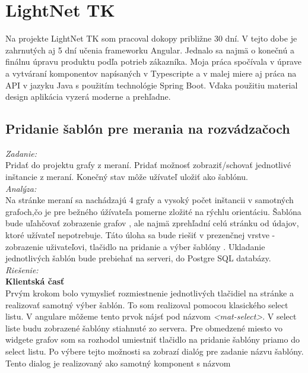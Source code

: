\documentclass[11pt, oneside]{report}
\begin{document}
\section{LightNet TK}
Na projekte LightNet TK som pracoval dokopy približne  30 dní. V tejto dobe  je zahrnutých aj 5 dní učenia frameworku Angular. Jednalo sa najmä o konečnú a finálnu úpravu produktu podľa potrieb zákazníka. Moja práca spočívala v úprave a vytváraní  komponentov napísaných v Typescripte a v malej miere aj práca na API  v jazyku Java s použitím technológie Spring Boot. Vďaka použitiu material design aplikácia vyzerá moderne a prehľadne.
\subsection{Pridanie šablón pre merania na rozvádzačoch }
\textit{Zadanie:}\\
Pridať do projektu grafy  z meraní. Pridať možnosť zobraziť/schovať jednotlivé inštancie  z meraní. Konečný stav môže užívateľ uložiť ako šablónu.
\\\textit{Analýza:}\\
Na stránke meraní sa nachádzajú 4 grafy  a vysoký počet inštancii v samotných grafoch,čo  je pre bežného úžívateľa pomerne zložité na rýchlu orientáciu. 
Šablóna bude uľahčovať zobrazenie grafov , ale najmä zprehľadní celú stránku od  údajov, ktoré užívateľ nepotrebuje. Táto úloha sa bude riešiť v prezenčnej vrstve - zobrazenie uživateľovi, tlačidlo na pridanie a výber šablóny . Ukladanie jednotlivých šablón bude prebiehať  na serveri, do Postgre SQL databázy.
\\\textit{Riešenie:}\\
\textbf{Klientská časť}\\
Prvým krokom bolo vymyslieť rozmiestnenie jednotlivých  tlačidiel na stránke a realizovať samotný výber šablón. To som realizoval pomocou klasického select listu. V angulare môžeme tento  prvok nájsť pod názvom 
\textit{<mat-select>}. V select liste budu zobrazené šablóny stiahnuté zo servera. Pre obmedzené miesto vo widgete grafov som sa rozhodol umiestniť tlačidlo na pridanie šablóny priamo do select listu. Po výbere tejto možnosti sa zobrazí dialóg pre zadanie názvu šablóny. Tento dialog je realizovaný ako samotný komponent s názvom 
\end{document}

